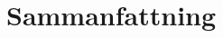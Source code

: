 \documentclass[../report.tex]{subfiles}
\begin{document}
    \chapter{Sammanfattning}
\end{document}
